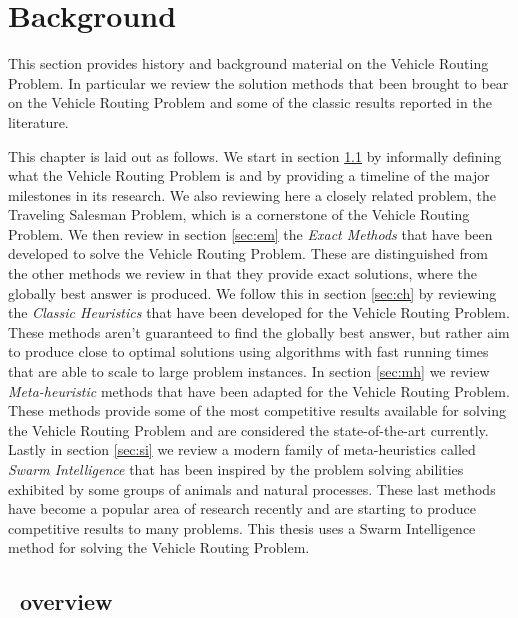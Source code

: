 
\chapter{Background}
This section provides history and background material on the Vehicle Routing Problem. In particular we review the solution methods that been brought to bear on the Vehicle Routing Problem and some of the classic results reported in the literature. 

This chapter is laid out as follows. We start in section \ref{sec:vo} by informally defining what the Vehicle Routing Problem is and by providing a timeline of the major milestones in its research. We also reviewing here a closely related problem, the Traveling Salesman Problem, which is a cornerstone of the Vehicle Routing Problem. We then review in section \ref{sec:em} the \emph{Exact Methods} that have been developed to solve the Vehicle Routing Problem. These are distinguished from the other methods we review in that they provide exact solutions, where the globally best answer is produced. We follow this in section \ref{sec:ch} by reviewing the \emph{Classic Heuristics} that have been developed for the Vehicle Routing Problem. These methods aren't guaranteed to find the globally best answer, but rather aim to produce close to optimal solutions using algorithms with fast running times that are able to scale to large problem instances. In section \ref{sec:mh} we review \emph{Meta-heuristic} methods that have been adapted for the Vehicle Routing Problem. These methods provide some of the most competitive results available for solving the Vehicle Routing Problem and are considered the state-of-the-art currently. Lastly in section \ref{sec:si} we review a modern family of meta-heuristics called \emph{Swarm Intelligence} that has been inspired by the problem solving abilities exhibited by some groups of animals and natural processes. These last methods have become a popular area of research recently and are starting to produce competitive results to many problems. This thesis uses a Swarm Intelligence method for solving the Vehicle Routing Problem.


\section{\VRP\ overview}
\label{sec:vo}

